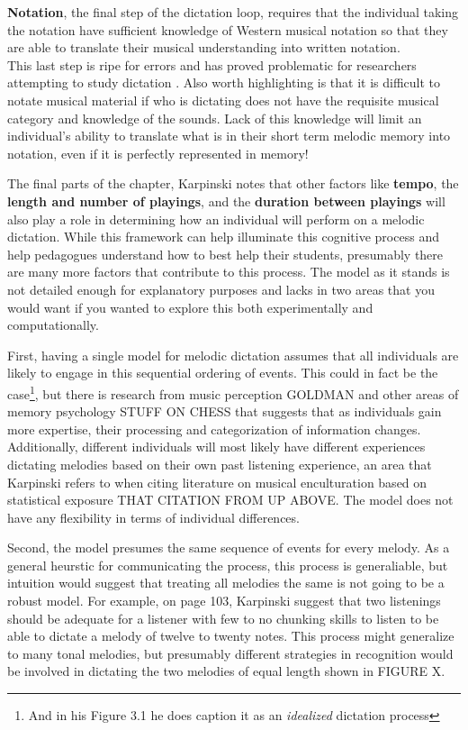 \documentclass[]{book}
\let\rmarkdownfootnote\footnote%
\def\footnote{\protect\rmarkdownfootnote}
\theoremstyle{definition}
\theoremstyle{definition}
\theoremstyle{definition}
\theoremstyle{remark}
\begin{document}
\textbf{Notation}, the final step of the dictation loop, requires that
the individual taking the notation have sufficient knowledge of Western
musical notation so that they are able to translate their musical
understanding into written notation.\\
This last step is ripe for errors and has proved problematic for
researchers attempting to study dictation
\citep{taylorStrategiesMemoryShort1983}
\citep{klonoskiImprovingDictationAuralSkills2006}. Also worth
highlighting is that it is difficult to notate musical material if who
is dictating does not have the requisite musical category and knowledge
of the sounds. Lack of this knowledge will limit an individual's ability
to translate what is in their short term melodic memory into notation,
even if it is perfectly represented in memory!

The final parts of the chapter, Karpinski notes that other factors like
\textbf{tempo}, the \textbf{length and number of playings}, and the
\textbf{duration between playings} will also play a role in determining
how an individual will perform on a melodic dictation. While this
framework can help illuminate this cognitive process and help pedagogues
understand how to best help their students, presumably there are many
more factors that contribute to this process. The model as it stands is
not detailed enough for explanatory purposes and lacks in two areas that
you would want if you wanted to explore this both experimentally and
computationally.

First, having a single model for melodic dictation assumes that all
individuals are likely to engage in this sequential ordering of events.
This could in fact be the case\footnote{And in his Figure 3.1 he does
  caption it as an \emph{idealized} dictation process }, but there is
research from music perception GOLDMAN and other areas of memory
psychology STUFF ON CHESS that suggests that as individuals gain more
expertise, their processing and categorization of information changes.
Additionally, different individuals will most likely have different
experiences dictating melodies based on their own past listening
experience, an area that Karpinski refers to when citing literature on
musical enculturation based on statistical exposure THAT CITATION FROM
UP ABOVE. The model does not have any flexibility in terms of individual
differences.

Second, the model presumes the same sequence of events for every melody.
As a general heurstic for communicating the process, this process is
generaliable, but intuition would suggest that treating all melodies the
same is not going to be a robust model. For example, on page 103,
Karpinski suggest that two listenings should be adequate for a listener
with few to no chunking skills to listen to be able to dictate a melody
of twelve to twenty notes. This process might generalize to many tonal
melodies, but presumably different strategies in recognition would be
involved in dictating the two melodies of equal length shown in FIGURE
X.
\end{document}
